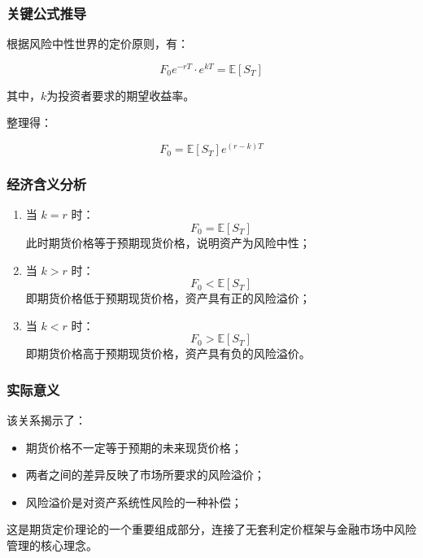 \subsubsection{关键公式推导}

根据风险中性世界的定价原则，有：

\[
F_0 e^{-rT} \cdot e^{kT} = \mathbb{E}[S_T]
\]

其中，$k$为投资者要求的期望收益率。

整理得：

\[
F_0 = \mathbb{E}[S_T] e^{(r - k)T}
\]

\subsubsection{经济含义分析}

\begin{enumerate}
  \item 当 $k = r$ 时：
  \[
  F_0 = \mathbb{E}[S_T]
  \]
  此时期货价格等于预期现货价格，说明资产为风险中性；
  
  \item 当 $k > r$ 时：
  \[
  F_0 < \mathbb{E}[S_T]
  \]
  即期货价格低于预期现货价格，资产具有正的风险溢价；
  
  \item 当 $k < r$ 时：
  \[
  F_0 > \mathbb{E}[S_T]
  \]
  即期货价格高于预期现货价格，资产具有负的风险溢价。
\end{enumerate}

\subsubsection{实际意义}

该关系揭示了：
\begin{itemize}
  \item 期货价格不一定等于预期的未来现货价格；
  \item 两者之间的差异反映了市场所要求的风险溢价；
  \item 风险溢价是对资产系统性风险的一种补偿；
\end{itemize}

这是期货定价理论的一个重要组成部分，连接了无套利定价框架与金融市场中风险管理的核心理念。

